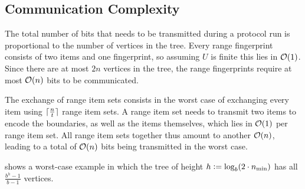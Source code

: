 \subsection{Communication Complexity}
\label{communication-complexity}

The total number of bits that needs to be transmitted during a protocol run is proportional to the number of vertices in the tree. Every range fingerprint consists of two items and one fingerprint, so assuming $U$ is finite this lies in $\mathcal{O}(1)$. Since there are at most $2n$ vertices in the tree, the range fingerprints require at most $\mathcal{O}(n)$ bits to be communicated.

The exchange of range item sets consists in the worst case of exchanging every item using $\lceil\frac{n}{t}\rceil$ range item sets. A range item set needs to transmit two items to encode the boundaries, as well as the items themselves, which lies in $\mathcal{O}(1)$ per range item set. All range item sets together thus amount to another $\mathcal{O}(n)$, leading to a total of $\mathcal{O}(n)$ bits being transmitted in the worst case.

 shows a worst-case example in which the tree of height $h \vcentcolon= \log_{b}(2 \cdot n_{\min})$ has all $\frac{b^{h} - 1}{b - 1}$ vertices.

